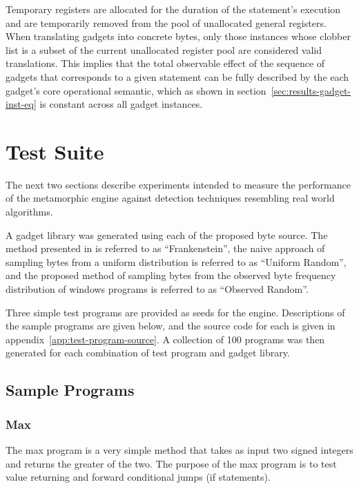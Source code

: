 \documentclass[finalcopy,short]{srpaper}
\begin{document}
            Temporary registers are allocated for the duration of the
            statement's execution and are temporarily removed from the pool of
            unallocated general registers. When translating gadgets into
            concrete bytes, only those instances whose clobber list is a subset
            of the current unallocated register pool are considered valid
            translations. This implies that the total observable effect of the
            sequence of gadgets that corresponds to a given statement can be
            fully described by the each gadget's core operational semantic,
            which as shown in section~\ref{sec:results-gadget-inst-eq} is
            constant across all gadget instances.
        
    \section{Test Suite}

        The next two sections describe experiments intended to measure the
        performance of the metamorphic engine against detection techniques
        resembling real world algorithms.

        A gadget library was generated using each of the proposed byte source.
        The method presented in \cite{franken} is referred to as
        ``Frankenstein'', the naive approach of sampling bytes from a uniform
        distribution is referred to as ``Uniform Random'', and the proposed method of
        sampling bytes from the observed byte frequency distribution of windows
        programs is referred to as ``Observed Random''.

        Three simple test programs are provided as seeds for the engine.
        Descriptions of the sample programs are given below, and the source code
        for each is given in appendix~\ref{app:test-program-source}. A
        collection of 100 programs was then generated for each combination of
        test program and gadget library.
        
        \subsection{Sample Programs}

            \subsubsection{Max}

                The max program is a very simple method that takes as input two
                signed integers and returns the greater of the two. The purpose
                of the max program is to test value returning and forward
                conditional jumps (if statements).
\end{document}
